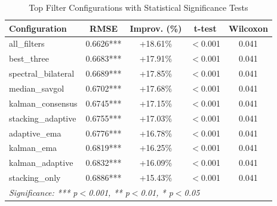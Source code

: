 \begin{table}[htbp]
\centering
\caption{Top Filter Configurations with Statistical Significance Tests}
\label{tab:statistical-significance}
\begin{tabular}{l|c|c|c|c}
\hline
\textbf{Configuration} & \textbf{RMSE} & \textbf{Improv. (\%)} & \textbf{t-test} & \textbf{Wilcoxon} \\
\hline
all\_filters & 0.6626*** & +18.61\% & $<$0.001 & 0.041 \\
best\_three & 0.6683*** & +17.91\% & $<$0.001 & 0.041 \\
spectral\_bilateral & 0.6689*** & +17.85\% & $<$0.001 & 0.041 \\
median\_savgol & 0.6702*** & +17.68\% & $<$0.001 & 0.041 \\
kalman\_consensus & 0.6745*** & +17.15\% & $<$0.001 & 0.041 \\
stacking\_adaptive & 0.6755*** & +17.03\% & $<$0.001 & 0.041 \\
adaptive\_ema & 0.6776*** & +16.78\% & $<$0.001 & 0.041 \\
kalman\_ema & 0.6819*** & +16.25\% & $<$0.001 & 0.041 \\
kalman\_adaptive & 0.6832*** & +16.09\% & $<$0.001 & 0.041 \\
stacking\_only & 0.6886*** & +15.43\% & $<$0.001 & 0.041 \\
\hline
\multicolumn{5}{l}{\textit{Significance: *** p$<$0.001, ** p$<$0.01, * p$<$0.05}} \\
\hline
\end{tabular}
\end{table}